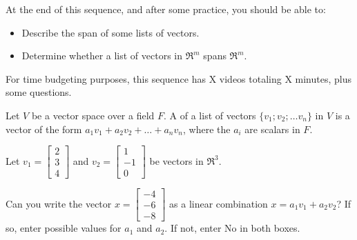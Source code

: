 







At the end of this sequence, and after some practice, you should be able to:

\begin{itemize}
\item Describe the span of some lists of vectors.
\item Determine whether a list of vectors in $\Re^m$ spans $\Re^m$.  
\end{itemize}


For time budgeting purposes, this sequence has X videos totaling X minutes, 
plus some questions.  




\endedxtext

\endedxvertical





Let $V$ be a vector space over a field $F$.  A {} of a list of vectors $\{v_1; v_2; 
\ldots v_n\}$
in $V$ is a vector of the form $a_1v_1 + a_2v_2 + \ldots + a_n v_n$, where the $a_i$ are scalars in $F$.  


\endedxtext


\endedxvertical






Let $v_1 = \left[\begin{array}{c} 2 \\ 3  \\ 4 \end{array} \right]$ and  
$v_2 = \left[\begin{array}{c} 1 \\ -1  \\ 0 \end{array} \right]$ be vectors in $\Re^3$.

Can you write the vector $x  = \left[\begin{array}{c} -4 \\ -6  \\ -8 \end{array} \right]$
as a linear combination $x = a_1 v_1 + a_2 v_2$?  If so, enter possible values for $a_1$ and
$a_2$.  If not, enter No in both boxes.  


